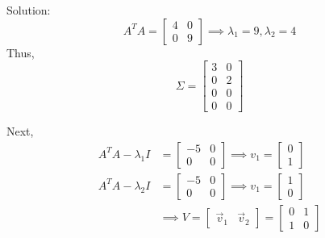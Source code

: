 \documentclass[12pt]{article} %
\begin{document}
{Solution:
$$A^T A = \begin{bmatrix}
	4 & 0\\
	0 & 9
\end{bmatrix} \implies \lambda_1 = 9, \lambda_2 = 4$$
Thus,
$$\Sigma = \begin{bmatrix}
	3 & 0\\
	0 & 2\\
	0 & 0\\
	0 & 0
\end{bmatrix}$$

Next,
\begin{align*}
	A^T A - \lambda_1 I &= \begin{bmatrix}
		-5 & 0\\
		0 & 0
	\end{bmatrix} \implies v_1 = \begin{bmatrix}
		0\\1
	\end{bmatrix}\\
	A^T A - \lambda_2 I &= \begin{bmatrix}
		-5 & 0\\
		0 & 0
	\end{bmatrix} \implies v_1 = \begin{bmatrix}
		1\\0
	\end{bmatrix}\\
	&\implies V = \begin{bmatrix}
		\vec{v}_1 & \vec{v}_2
	\end{bmatrix} = \begin{bmatrix}
		0 & 1\\
		1 & 0
	\end{bmatrix}
\end{align*}

}
\end{document}
